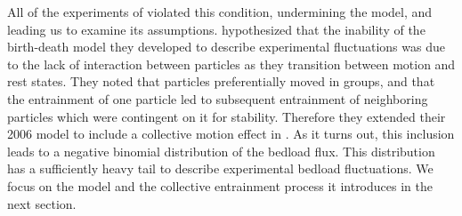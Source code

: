 All of the experiments of \citet{Ancey2006} violated this condition, undermining the model, and leading us to examine its assumptions.  
\citet{Ancey2006} hypothesized that the inability of the birth-death model they developed to describe experimental fluctuations was due to the lack of interaction between particles as they transition between motion and rest states. 
They noted that particles preferentially moved in groups, and that the entrainment of one particle led to subsequent entrainment of neighboring particles which were contingent on it for stability. 
Therefore they extended their 2006 model to include a collective motion effect in \citet{Ancey2008}. 
As it turns out, this inclusion leads to a negative binomial distribution of the bedload flux.
This distribution has a sufficiently heavy tail to describe experimental bedload fluctuations. 
We focus on the \citet{Ancey2008} model and the collective entrainment process it introduces in the next section.
 

